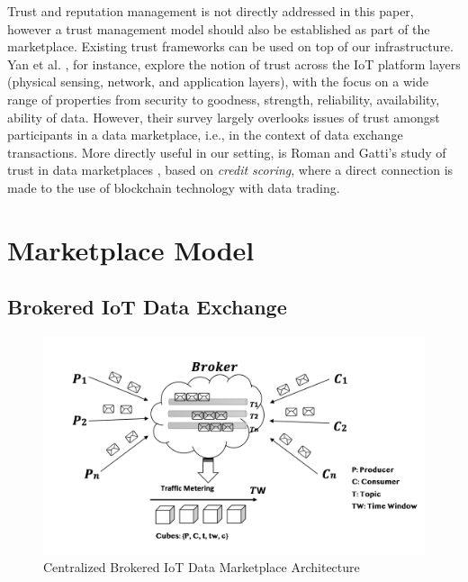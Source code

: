 \documentclass[letterpaper, 10 pt, conference]{ieeeconf}  %
\begin{document}
Trust and reputation management is not directly addressed in this paper, however a trust management model should also be established as part of the marketplace. Existing trust frameworks can be used on top of our infrastructure.
Yan et al. \cite{Yan2014a}, for instance, explore the notion of trust across the IoT platform layers (physical sensing, network, and application layers), with the focus on a wide range of properties from security to goodness, strength, reliability, availability, ability of data. However, their survey largely overlooks issues of trust amongst participants in a data marketplace, i.e., in the context of data exchange transactions.
%
More directly useful in our setting, is Roman and Gatti's study of trust in data marketplaces \cite{7573695}, based on \textit{credit scoring}, where a direct connection is made to the use of blockchain technology with data trading.

\section{Marketplace Model} \label{sec:MKModel}

\subsection{Brokered IoT Data Exchange} \label{sec:daga-exchange}

\begin{figure}
  \caption{Centralized Brokered IoT Data Marketplace Architecture}
  \label{fig:brokered-data-exchange}
  \includegraphics[scale=0.4]{Cent}

\end{figure}
\end{document}
